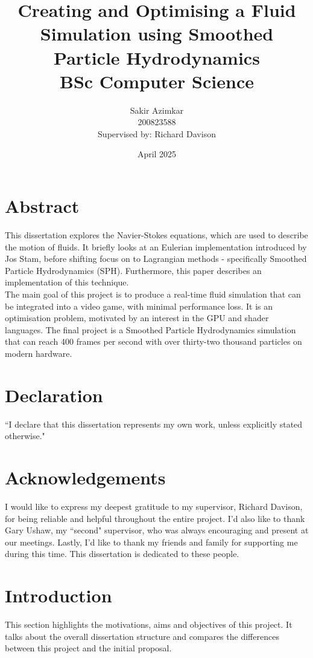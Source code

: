 \documentclass[12pt]{article}
\title
{
    {\Huge Creating and Optimising a Fluid Simulation using Smoothed Particle Hydrodynamics} \\
    \vspace*{1cm}
    {\LARGE BSc Computer Science}
}
\author
{
    \vspace*{0.1cm}\huge Sakir Azimkar \\
    \vspace*{1cm}\huge 200823588 \\
    \large Supervised by: Richard Davison
}
\date{April 2025}
\begin{document}
    \maketitle
    \thispagestyle{empty}

    \newpage

    \section*{Abstract}
    This dissertation explores the Navier-Stokes equations, which are used to describe the motion of fluids. It briefly looks at an Eulerian implementation introduced by Jos Stam\cite{stam}, before shifting focus on to Lagrangian methods - specifically Smoothed Particle Hydrodynamics (SPH). Furthermore, this paper describes an implementation of this technique. \\ The main goal of this project is to produce a real-time fluid simulation that can be integrated into a video game, with minimal performance loss. It is an optimisation problem, motivated by an interest in the GPU and shader languages. The final project is a Smoothed Particle Hydrodynamics simulation that can reach 400 frames per second with over thirty-two thousand particles on modern hardware.
    
    \newpage

    \section*{Declaration} ``I declare that this dissertation represents my own work, unless explicitly stated otherwise."

    \newpage

    \section*{Acknowledgements}
    I would like to express my deepest gratitude to my supervisor, Richard Davison, for being reliable and helpful throughout the entire project. I'd also like to thank Gary Ushaw, my ``second" supervisor, who was always encouraging and present at our meetings. Lastly, I'd like to thank my friends and family for supporting me during this time. This dissertation is dedicated to these people.
    
    \newpage
    \tableofcontents
    \newpage
    \listoffigures
    \newpage

    \section{Introduction}
    \label{sec:introduction}
    This section highlights the motivations, aims and objectives of this project. It talks about the overall dissertation structure and compares the differences between this project and the initial proposal.
    
\end{document}
